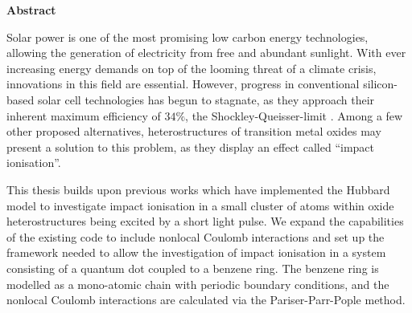 \def\changemargin#1#2{\list{}{\rightmargin#2\leftmargin#1}\item[]}
\let\endchangemargin=\endlist 

{\small\begin{center}%
\bfseries{Abstract}
\end{center}}

\begin{changemargin}{1.5cm}{1.5cm}

Solar power is one of the most promising low carbon energy technologies, allowing the generation of electricity from free and abundant sunlight. With ever increasing energy demands on top of the looming threat of a climate crisis, innovations in this field are essential. However, progress in conventional silicon-based solar cell technologies has begun to stagnate, as they approach their inherent maximum efficiency of $34\%$, the Shockley-Queisser-limit \cite{shockley_queisser}. Among a few other proposed alternatives, heterostructures of transition metal oxides may present a solution to this problem, as they display an effect called ``impact ionisation''.

\smallskip

This thesis builds upon previous works \cite{innerberger, worm_bachelor, prauhart, worm_project} which have implemented the Hubbard model to investigate impact ionisation in a small cluster of atoms within oxide heterostructures being excited by a short light pulse. We expand the capabilities of the existing code to include nonlocal Coulomb interactions and set up the framework needed to allow the investigation of impact ionisation in a system consisting of a quantum dot coupled to a benzene ring. The benzene ring is modelled as a mono-atomic chain with periodic boundary conditions, and the nonlocal Coulomb interactions are calculated via the Pariser-Parr-Pople method. 
\end{changemargin}